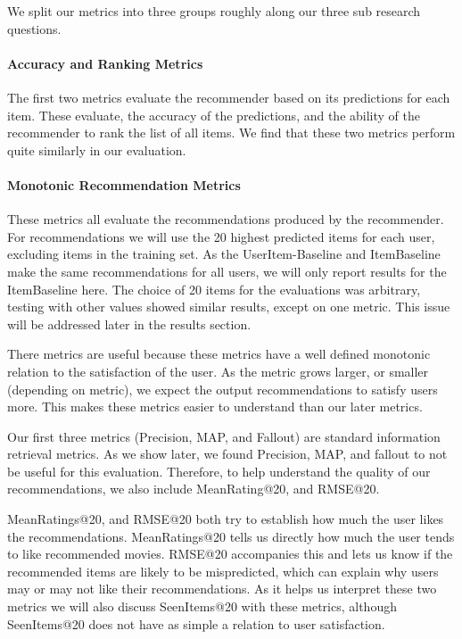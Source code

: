 \documentclass[letterpaper]{sig-alternate}
\begin{document}
  \addtocounter{footnote}{1}

  We split our metrics into three groups roughly along our three sub research questions.
  
  \paragraph{Accuracy and Ranking Metrics}
  The first two metrics evaluate the recommender based on its predictions for each item.
  These evaluate, the accuracy of the predictions, and the ability of the recommender to rank the list of all items.
  We find that these two metrics perform quite similarly in our evaluation.

  \paragraph{Monotonic Recommendation Metrics}
  These metrics all evaluate the recommendations produced by the recommender.
  For recommendations we will use the 20 highest predicted items for each user, excluding items in the training set.
  As the UserItem-Baseline and ItemBaseline make the same recommendations for all users, we will only report results for the ItemBaseline here.
  The choice of 20 items for the evaluations was arbitrary, testing with other values showed similar results, except on one metric.
  This issue will be addressed later in the results section.
  
  There metrics are useful because these metrics have a well defined monotonic relation to the satisfaction of the user.
  As the metric grows larger, or smaller (depending on metric), we expect the output recommendations to satisfy users more.
  This makes these metrics easier to understand than our later metrics.

  Our first three metrics (Precision, MAP, and Fallout) are standard information retrieval metrics.
  As we show later, we found Precision, MAP, and fallout to not be useful for this evaluation.
  Therefore, to help understand the quality of our recommendations, we also include MeanRating@20, and RMSE@20.

  MeanRatings@20, and RMSE@20 both try to establish how much the user likes the recommendations.
  MeanRatings@20 tells us directly how much the user tends to like recommended movies.
  RMSE@20 accompanies this and lets us know if the recommended items are likely to be mispredicted, which can explain why users may or may not like their recommendations.
  As it helps us interpret these two metrics we will also discuss SeenItems@20 with these metrics, although SeenItems@20 does not have as simple a relation to user satisfaction.
\end{document}
